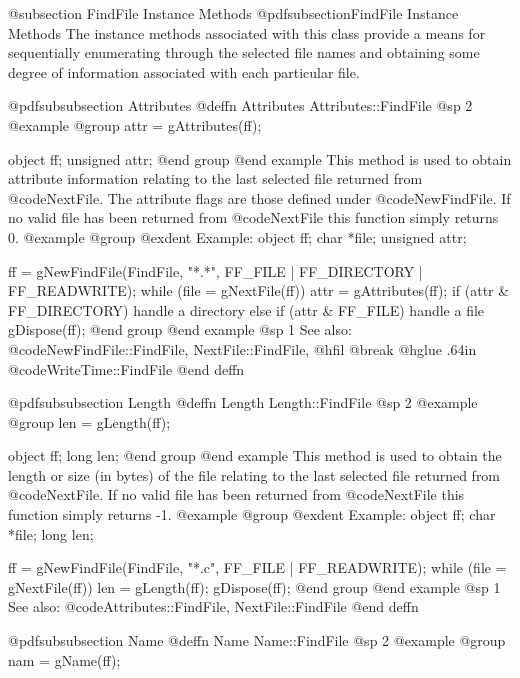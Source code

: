 @subsection FindFile Instance Methods
@pdfsubsection{FindFile Instance Methods}
The instance methods associated with this class provide a means for
sequentially enumerating through the selected file names and obtaining
some degree of information associated with each particular file.




@pdfsubsubsection {Attributes}
@deffn {Attributes} Attributes::FindFile
@sp 2
@example
@group
attr = gAttributes(ff);

object       ff;
unsigned     attr;
@end group
@end example
This method is used to obtain attribute information relating to the last
selected file returned from @code{NextFile}.  The attribute flags are those
defined under @code{NewFindFile}.  If no valid file has been returned from
@code{NextFile} this function simply returns 0.
@example
@group
@exdent Example:
object    ff;
char     *file;
unsigned  attr;

ff = gNewFindFile(FindFile, "*.*",
                  FF_FILE | FF_DIRECTORY | FF_READWRITE);
while (file = gNextFile(ff))  {
        attr = gAttributes(ff);
        if (attr & FF_DIRECTORY)
                handle a directory
        else if (attr & FF_FILE)
                handle a file
}
gDispose(ff);
@end group
@end example
@sp 1
See also:  @code{NewFindFile::FindFile, NextFile::FindFile,}
@hfil @break @hglue .64in      @code{WriteTime::FindFile}
@end deffn








@pdfsubsubsection {Length}
@deffn {Length} Length::FindFile
@sp 2
@example
@group
len = gLength(ff);

object  ff;
long    len;
@end group
@end example
This method is used to obtain the length or size (in bytes) of the file
relating to the last selected file returned from @code{NextFile}.  If
no valid file has been returned from @code{NextFile} this function
simply returns -1.
@example
@group
@exdent Example:
object  ff;
char    *file;
long    len;

ff = gNewFindFile(FindFile, "*.c", FF_FILE | FF_READWRITE);
while (file = gNextFile(ff))  {
        len = gLength(ff);
}
gDispose(ff);
@end group
@end example
@sp 1
See also:  @code{Attributes::FindFile, NextFile::FindFile}
@end deffn









@pdfsubsubsection {Name}
@deffn {Name} Name::FindFile
@sp 2
@example
@group
nam = gName(ff);

